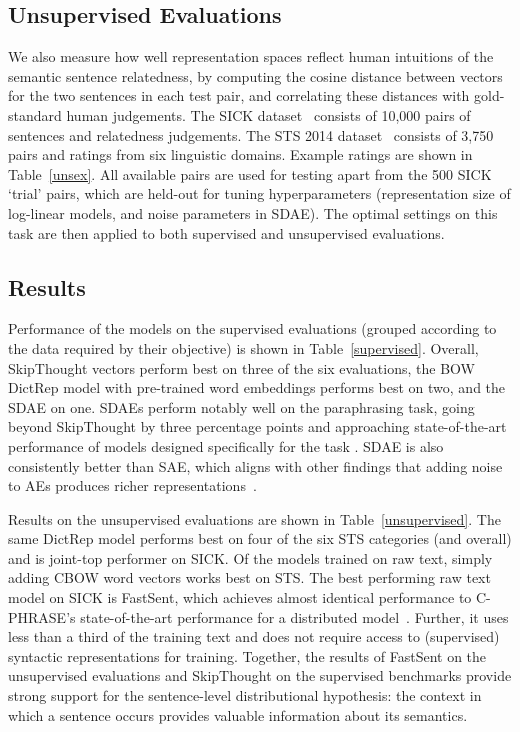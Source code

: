 \subsection{Unsupervised Evaluations}
\label{unseval}
We also measure how well representation spaces reflect human intuitions of the semantic sentence relatedness, by computing the cosine distance between vectors for the two sentences in each test pair, and correlating these distances with gold-standard human judgements. The SICK dataset~\cite{marelli2014sick} consists of 10,000 pairs of sentences and relatedness judgements. The STS 2014 dataset~\cite{agirre2014semeval} consists of 3,750 pairs and ratings from six linguistic domains. Example ratings are shown in Table~\ref{unsex}. All available pairs are used for testing apart from the 500 SICK `trial' pairs, which are held-out for tuning hyperparameters (representation size of log-linear models, and noise parameters in SDAE). The optimal settings on this task are then applied to both supervised and unsupervised evaluations.  



\subsection{Results}

Performance of the models on the supervised evaluations (grouped according to the data required by their objective) is shown in Table~\ref{supervised}. Overall, SkipThought vectors perform best on three of the six evaluations, the BOW DictRep model with pre-trained word embeddings performs best on two, and the SDAE on one. SDAEs perform notably well on the paraphrasing task, going beyond SkipThought by three percentage points and approaching state-of-the-art performance of models designed specifically for the task \cite{ji2013discriminative}. SDAE is also consistently better than SAE, which aligns with other findings that adding noise to AEs produces richer representations~\cite{vincent2008extracting}.  

Results on the unsupervised evaluations are shown in Table~\ref{unsupervised}. The same DictRep model performs best on four of the six STS categories (and overall) and is joint-top performer on SICK. Of the models trained on raw text, simply adding CBOW word vectors works best on STS. The best performing raw text model on SICK is FastSent, which achieves almost identical performance to C-PHRASE's state-of-the-art performance for a distributed model~\cite{marcobaronijointly}. Further, it uses less than a third of the training text and does not require access to (supervised) syntactic representations for training. Together, the results of FastSent on the unsupervised evaluations and SkipThought on the supervised benchmarks provide strong support for the sentence-level distributional hypothesis: the context in which a sentence occurs provides valuable  information about its semantics.


